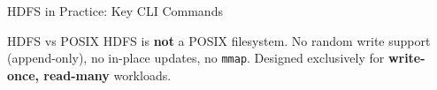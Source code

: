 \documentclass[aspectratio=169,10pt]{beamer}
\begin{document}
\begin{frame}[fragile]{HDFS in Practice: Key CLI Commands}
   
      
      \vspace{4pt}
      \begin{alertblock}{HDFS vs POSIX}
        HDFS is \textbf{not} a POSIX filesystem.  No random write support (append-only), no in-place updates, no \texttt{mmap}.  Designed exclusively for \textbf{write-once, read-many} workloads.
      \end{alertblock}
 
\end{frame}

\end{document}
